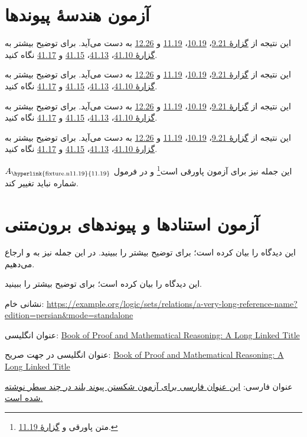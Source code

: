\documentclass[14pt,oneside,openany]{memoir}
\newcommand{\GRef}[1]{\hyperlink{fixture.n#1}{#1}}
\newcommand{\GNamedRef}[1]{\hyperlink{fixture.n#1}{گزارهٔ #1}}
\newcommand{\GList}{\GNamedRef{9.21}، \GRef{10.19}، \GRef{11.19} و \GRef{12.26}}
\newcommand{\GSample}[1]{%
  \par\noindent\begin{minipage}{#1}\raggedleft
  این نتیجه از \GList{} به دست می‌آید. برای توضیح بیشتر به \GNamedRef{41.10}،
  \GRef{41.13}، \GRef{41.15} و \GRef{41.17} نگاه کنید.
  \end{minipage}\par\medskip}
\begin{document}
\chapter*{آزمون هندسهٔ پیوندها}
\noindent{}\par
\GSample{468pt}\GSample{350pt}\GSample{260pt}\GSample{190pt}
\noindent این جمله نیز برای آزمون پاورقی است\footnote{متن پاورقی و \GNamedRef{11.19}.}
و در فرمول \(A_{\text{\GRef{11.19}}}\) شماره نباید تغییر کند.
\newpage
\chapter*{آزمون استنادها و پیوندهای برون‌متنی}
\noindent\begin{minipage}{468pt}\raggedleft
این دیدگاه را \citet{Cantor1892} بیان کرده است؛ برای توضیح بیشتر
\citep{Frege1884,Benacerraf1965,Magnus2021} را ببینید.
در این جمله نیز به \citet{Solow2013} و \citet{Hammack2013} ارجاع می‌دهیم.
\end{minipage}\par\medskip
\noindent\begin{minipage}{190pt}\raggedleft
این دیدگاه را \citet{Cantor1892} بیان کرده است؛ برای توضیح بیشتر
\citep{Frege1884,Benacerraf1965,Magnus2021} را ببینید.
\end{minipage}\par\bigskip
\noindent\begin{minipage}{260pt}\raggedleft
نشانی خام:
\url{https://example.org/logic/sets/relations/a-very-long-reference-name?edition=persian&mode=standalone}
\par عنوان انگلیسی:
\href{https://example.org/book-of-proof}{Book of Proof and Mathematical Reasoning: A Long Linked Title}
\par عنوان انگلیسی در جهت صریح:
\foreignlanguage{english}{\href{https://example.org/explicit-ltr-title}{Book of Proof and Mathematical Reasoning: A Long Linked Title}}
\par عنوان فارسی:
\href{https://example.org/persian-title}{این عنوان فارسی برای آزمون شکستن پیوند بلند در چند سطر نوشته شده است.}
\end{minipage}
\newpage
\end{document}

